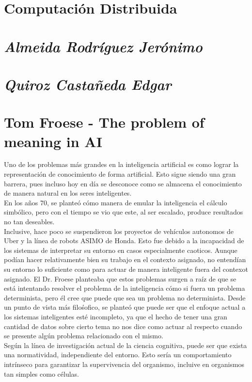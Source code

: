 \documentclass[a4paper,12pt]{article}
\begin{document}
\begin{center}
	\section*{Computación Distribuida}
	\section*{\textit{Almeida Rodríguez Jerónimo}}
	\section*{\textit{Quiroz Castañeda Edgar}}
\end{center}


\section{Tom Froese - The problem of meaning in AI}
Uno de los problemas más grandes en la inteligencia artificial es como lograr la representación de conocimiento de forma artificial. Esto sigue siendo una gran barrera, pues incluso hoy en día se desconoce como se almacena el conocimiento de manera natural en los seres inteligentes.\\
En los años 70, se planteó cómo manera de emular la inteligencia el cálculo simbólico, pero con el tiempo se vio que este, al ser escalado, produce resultados no tan deseables.\\
Inclusive, hace poco se suspendieron los proyectos de vehículos autonomos de Uber y la línea de robots ASIMO de Honda. Esto fue debido a la incapacidad de los sistemas de interpretar su entorno en casos especialmente caoticos. Aunque podían hacer relativamente bien su trabajo en el contexto asignado, no entendían su entorno lo suficiente como para actuar de manera inteligente fuera del contexot asignado. El Dr. Froese planteaba que estos problemas surgen a raíz de que se está intentando resolver el problema de la inteligencia cómo si fuera un problema determinista, pero él cree que puede que sea un problema no determinista.
Desde un punto de vista más filośofico, se planteó que puede ser que el enfoque actual a los sistemas inteligentes esté incompleto, ya que el hecho de tener una gran cantidad de datos sobre cierto tema no nos dice como actuar al respecto cuando se presente algún problema relacionado con el mismo.\\
Según la línea de investigación actual de la ciencia cognitiva, puede ser que exista una normatividad, independiente del entorno. Esto sería un comportamiento intrínseco para garantizar la supervivencia del organismo, incluive en organismos tan simples como células. \\
\end{document}
